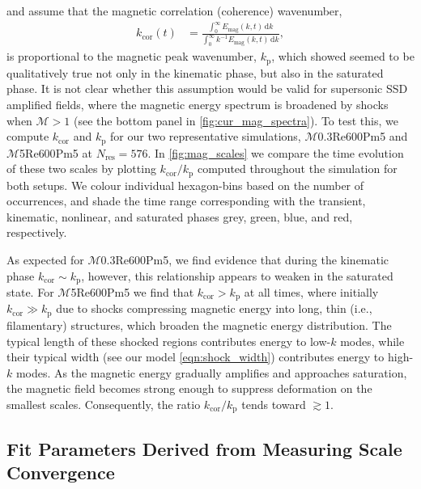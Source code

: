 \documentclass[12pt,twoside]{extreport}
\newcommand{\mdd}[1]{\mathrm{d} #1}
\newcommand{\mReh}{\ensuremath{\mathrm{Re}}} %
\newcommand{\mPrm}{\ensuremath{\mathrm{Pm}}} %
\newcommand{\mSonicMach}{\ensuremath{\mathcal{M}}} %
\newcommand{\ie}{i.e.,\xspace} %
\newcommand{\SimName}[3]{$\mSonicMach${#1}$\mReh${#2}$\mPrm${#3}}
\begin{document}
\citet{schekochihin2004simulations} and \citet{galishnikova2022tearing} assume that the magnetic correlation (coherence) wavenumber,
\begin{align}
    k_\mathrm{cor}(t)
        &= \frac{
                \int_{0}^{\infty} E_\mathrm{mag}(k, t) \,\mdd{k}
            }{
                \int_{0}^{\infty} k^{-1} E_\mathrm{mag}(k, t) \,\mdd{k}
            }
        , \label{eqn:cor_scale}
\end{align}
is proportional to the magnetic peak wavenumber, $k_\mathrm{p}$, which \citet{beattie2022growth} showed seemed to be qualitatively true not only in the kinematic phase, but also in the saturated phase. It is not clear whether this assumption would be valid for supersonic SSD amplified fields, where the magnetic energy spectrum is broadened by shocks when $\mSonicMach > 1$ (see the bottom panel in \autoref{fig:cur_mag_spectra}). To test this, we compute $k_\mathrm{cor}$ and $k_\mathrm{p}$ for our two representative simulations, \SimName{0.3}{600}{5} and \SimName{5}{600}{5} at $N_\mathrm{res} = 576$. In \autoref{fig:mag_scales} we compare the time evolution of these two scales by plotting $k_\mathrm{cor}/k_\mathrm{p}$ computed throughout the simulation for both setups. We colour individual hexagon-bins based on the number of occurrences, and shade the time range corresponding with the transient, kinematic, nonlinear, and saturated phases grey, green, blue, and red, respectively.

As expected for \SimName{0.3}{600}{5}, we find evidence that during the kinematic phase $k_\mathrm{cor} \sim k_\mathrm{p}$, however, this relationship appears to weaken in the saturated state. For \SimName{5}{600}{5} we find that $k_\mathrm{cor} > k_\mathrm{p}$ at all times, where initially $k_\mathrm{cor} \gg k_\mathrm{p}$ due to shocks compressing magnetic energy into long, thin (\ie filamentary) structures, which broaden the magnetic energy distribution. The typical length of these shocked regions contributes energy to low-$k$ modes, while their typical width (see our model \autoref{eqn:shock_width}) contributes energy to high-$k$ modes. As the magnetic energy gradually amplifies and approaches saturation, the magnetic field becomes strong enough to suppress deformation on the smallest scales. Consequently, the ratio $k_\mathrm{cor} / k_\mathrm{p}$ tends toward $\gtrsim 1$.

\subsection{Fit Parameters Derived from Measuring Scale Convergence}
\end{document}
